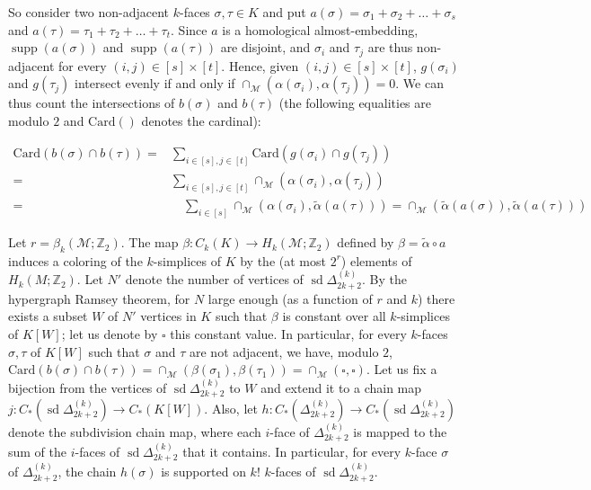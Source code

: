 \documentclass[a4paper,UKenglish,thm-restate]{article}
\newcommand{\Z}{\mathbb{Z}}
\newcommand{\M}{\mathcal{M}}
\DeclareMathOperator{\supp}{supp}
\DeclareMathOperator{\sd}{sd}
\newcommand{\card}[1]{\textrm{Card}\pth{#1}}
\newcommand{\pth}[1]{\left(#1\right)}
\begin{document}
\medskip

So consider two non-adjacent $k$-faces $\sigma,\tau \in K$ and put $a(\sigma) = \sigma_1+\sigma_2+\ldots +\sigma_s$ and $a(\tau) =\tau_1+\tau_2+\ldots+\tau_t$. Since $a$ is a homological almost-embedding, $\supp(a(\sigma))$ and $\supp(a(\tau))$ are disjoint, and $\sigma_i$ and $\tau_j$ are thus non-adjacent for every $(i,j) \in [s] \times [t]$. Hence, given $(i,j) \in [s] \times [t]$, $g(\sigma_i)$ and $g(\tau_j)$ intersect evenly if and only if $\cap_{\M}(\alpha(\sigma_i),\alpha(\tau_j)) = 0$. We can thus count the intersections of $b(\sigma)$ and $b(\tau)$ (the following equalities are modulo $2$ and $\card{}$ denotes the cardinal):

\[\begin{aligned}
\card{b(\sigma) \cap b(\tau)} = &\sum_{i \in [s], j \in [t]} \card{g(\sigma_i) \cap g(\tau_j)}\\
= &\sum_{i \in [s], j \in [t]} \cap_{\M}(\alpha(\sigma_i),\alpha(\tau_j))\\
= &\quad\sum_{i \in [s]} \cap_{\M}(\alpha(\sigma_i),\tilde{\alpha}(a(\tau)))= \cap_{\M}(\tilde{\alpha}(a(\sigma)),\tilde{\alpha}(a(\tau)))
\end{aligned}  \]

\medskip

Let $r = \beta_k(\M;\Z_2)$. The map $\beta: C_k(K) \to H_k(\M;\Z_2)$ defined by $\beta = \tilde{\alpha} \circ a$ induces a coloring of the $k$-simplices of $K$ by the (at most $2^r$) elements of $H_k(M;\Z_2)$. Let $N'$ denote the number of vertices of $\sd \Delta_{2k+2}^{(k)}$. By the hypergraph Ramsey theorem, for $N$ large enough (as a function of $r$ and $k$) there exists a subset $W$ of $N'$ vertices in $K$ such that $\beta$ is constant over all $k$-simplices of $K[W]$; let us denote by $\square$ this constant value. In particular, for every $k$-faces $\sigma,\tau$ of $K[W]$ such that $\sigma$ and $\tau$ are not adjacent, we have, modulo $2$, $\card{b(\sigma) \cap b(\tau)} = \cap_{\M}(\beta(\sigma_1),\beta(\tau_1)) = \cap_{\M}(\square,\square)$. Let us fix a bijection from the vertices of $\sd\Delta_{2k+2}^{(k)}$ to $W$ and extend it to a chain map $j:C_*\pth{\sd\Delta_{2k+2}^{(k)}}\to C_*(K[W])$. Also, let $h:C_*\pth{\Delta_{2k+2}^{(k)}}\to C_*\pth{\sd \Delta_{2k+2}^{(k)}}$ denote the subdivision chain map, where each $i$-face of $\Delta_{2k+2}^{(k)}$ is mapped to the sum of the $i$-faces of $\sd \Delta_{2k+2}^{(k)}$ that it contains. In particular, for every $k$-face $\sigma$ of $\Delta_{2k+2}^{(k)}$, the chain $h(\sigma)$ is supported on $k!$ $k$-faces of $\sd \Delta_{2k+2}^{(k)}$.
\end{document}
